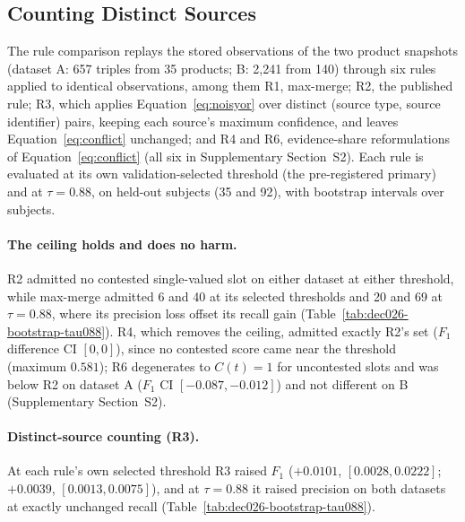 \documentclass[preprint,12pt,authoryear]{elsarticle}
\begin{document}
\subsection{Counting Distinct Sources}
\label{sec:formal-analysis-empirical}

The rule comparison replays the stored observations of the two product
snapshots (dataset A: 657 triples from 35 products; B: 2,241 from 140)
through six rules applied to identical observations, among them R1,
max-merge; R2, the published rule; R3, which applies
Equation~\ref{eq:noisyor} over distinct (source type, source identifier)
pairs, keeping each source's maximum confidence, and leaves
Equation~\ref{eq:conflict} unchanged; and R4 and R6, evidence-share
reformulations of Equation~\ref{eq:conflict} (all six in Supplementary
Section~S2). Each rule is evaluated at its own validation-selected
threshold (the pre-registered primary) and at $\tau=0.88$, on held-out
subjects (35 and 92), with bootstrap intervals over subjects.

\paragraph{The ceiling holds and does no harm.} R2 admitted no contested
single-valued slot on either dataset at either threshold, while max-merge
admitted 6 and 40 at its selected thresholds and 20 and 69 at
$\tau=0.88$, where its precision loss offset its recall gain
(Table~\ref{tab:dec026-bootstrap-tau088}). R4, which removes the ceiling,
admitted exactly R2's set ($F_1$ difference CI $[0,0]$), since no
contested score came near the threshold (maximum $0.581$); R6 degenerates
to $C(t)=1$ for uncontested slots and was below R2 on dataset A ($F_1$
CI $[-0.087,\allowbreak -0.012]$) and not different on B (Supplementary
Section~S2).

\paragraph{Distinct-source counting (R3).} At each rule's own selected
threshold R3 raised $F_1$ ($+0.0101$, $[0.0028,\allowbreak 0.0222]$; $+0.0039$,
$[0.0013,\allowbreak 0.0075]$), and at $\tau=0.88$ it raised precision on both
datasets at exactly unchanged recall
(Table~\ref{tab:dec026-bootstrap-tau088}).
\end{document}
